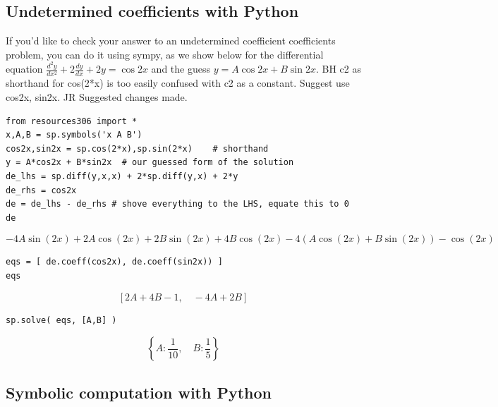 \documentclass[12pt]{book}
\begin{document}

\subsection{Undetermined coefficients with Python}

If you'd like to check your answer to an undetermined {\color{red}coefficient} 
{\color{blue}coefficients} problem, 
you can do it using sympy, as we show below for the differential equation $\frac{d^2y}{dx^2} + 2 \frac{dy}{dx} + 2 y = \cos 2x$
and the guess $y = A\cos 2x + B \sin 2x$.
{\color{teal}BH c2 as shorthand for cos(2*x) is too easily confused with c2 as a constant. 
Suggest use cos2x, sin2x. JR Suggested changes made.
}
\begin{small}
\begin{verbatim}
from resources306 import *
x,A,B = sp.symbols('x A B')
cos2x,sin2x = sp.cos(2*x),sp.sin(2*x)    # shorthand
y = A*cos2x + B*sin2x  # our guessed form of the solution
de_lhs = sp.diff(y,x,x) + 2*sp.diff(y,x) + 2*y
de_rhs = cos2x
de = de_lhs - de_rhs # shove everything to the LHS, equate this to 0
de
\end{verbatim}
\end{small}
$$ - 4 A \sin{\left (2 x \right )} + 2 A \cos{\left (2 x \right )} + 2 B \sin{\left (2 x \right )} + 4 B \cos{\left (2 x \right )} - 4 \left(A \cos{\left (2 x \right )} + B \sin{\left (2 x \right )}\right) - \cos{\left (2 x \right )} $$
\begin{small}
\begin{verbatim}
eqs = [ de.coeff(cos2x), de.coeff(sin2x)) ]
eqs
\end{verbatim}
\end{small}
$$\left [ 2 A + 4 B - 1, \quad - 4 A + 2 B\right ]$$
\begin{small}
\begin{verbatim}
sp.solve( eqs, [A,B] )
\end{verbatim}
\end{small}

$$ \left \{ A : \frac{1}{10}, \quad B : \frac{1}{5}\right \} $$





\subsection{Symbolic computation with Python}
\end{document}
